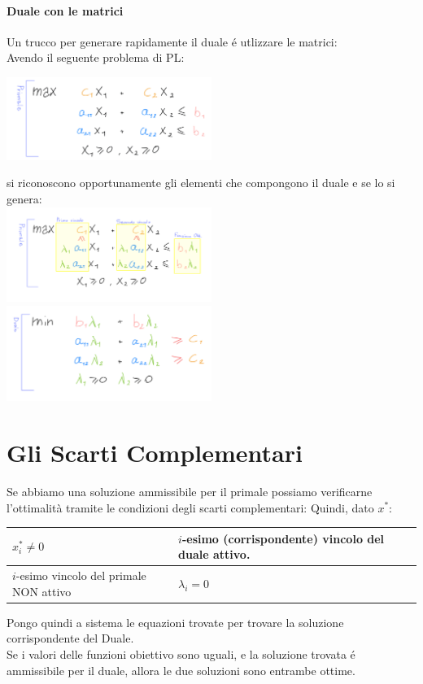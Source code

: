 \documentclass[12pt, a4paper, openany]{book}
\begin{document}
\paragraph{Duale con le matrici}
Un trucco per generare rapidamente il duale é utlizzare le matrici:\\
Avendo il seguente problema di PL:
\begin{center}
\includegraphics[width=0.5\textwidth]{dualita-cheatsheet-0.jpeg}
\end{center}
si riconoscono opportunamente gli elementi che compongono il duale e se lo si genera:\\
\includegraphics[width=0.5\textwidth]{dualita-cheatsheet-1.jpeg}
\includegraphics[width=0.5\textwidth]{dualita-cheatsheet-2.jpeg}

\pagebreak
\section{Gli Scarti Complementari}
Se abbiamo una soluzione ammissibile per il primale possiamo verificarne l'ottimalità tramite le condizioni degli scarti complementari:
Quindi, dato $x^*$:\\
\begin{center}
\begin{tabularx}{0.8\textwidth}{|Y|Y|}                                                            
\hline
$x_i^* \neq 0$ & $i$-esimo (corrispondente) vincolo del duale attivo. \\
\hline
$i$-esimo vincolo del primale NON attivo & $\lambda_i = 0$\\
\hline
\end{tabularx}
\end{center}
Pongo quindi a sistema le equazioni trovate per trovare la soluzione corrispondente del Duale.\\
Se i valori delle funzioni obiettivo sono uguali, e la soluzione trovata é ammissibile per il duale,
allora le due soluzioni sono entrambe ottime.
	
\end{document}
